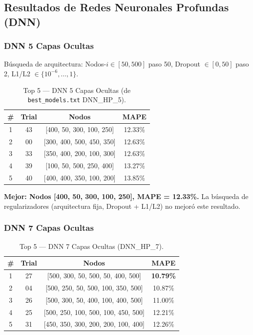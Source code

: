 \documentclass{article}
\begin{document}
\subsection{Resultados de Redes Neuronales Profundas (DNN)}

\subsubsection{DNN 5 Capas Ocultas}
Búsqueda de arquitectura: Nodos-$i \in [50, 500]$ paso 50, Dropout $\in [0, 50]$ paso 2, L1/L2 $\in \{10^{-6},\dots,1\}$.

\begin{table}[htbp]
\centering
\caption{Top 5 — DNN 5 Capas Ocultas (de \texttt{best\_models.txt} DNN\_HP\_5).}
\label{tab:dnn5}
\begin{tabular}{cccc}
\hline
\# & Trial & Nodos & MAPE \\
\hline
1 & 43 & [400, 50, 300, 100, 250] & 12.33\% \\
2 & 00 & [300, 400, 500, 450, 350] & 12.63\% \\
3 & 33 & [350, 400, 200, 100, 300] & 12.63\% \\
4 & 39 & [100, 50, 500, 250, 400] & 13.27\% \\
5 & 40 & [400, 400, 350, 100, 200] & 13.85\% \\
\hline
\end{tabular}
\end{table}

\textbf{Mejor: Nodos [400, 50, 300, 100, 250], MAPE = 12.33\%.} La búsqueda de regularizadores (arquitectura fija, Dropout + L1/L2) no mejoró este resultado.

\subsubsection{DNN 7 Capas Ocultas}

\begin{table}[htbp]
\centering
\caption{Top 5 — DNN 7 Capas Ocultas (DNN\_HP\_7).}
\label{tab:dnn7}
\begin{tabular}{cccc}
\hline
\# & Trial & Nodos & MAPE \\
\hline
1 & 27 & [500, 300, 50, 500, 50, 400, 500] & \textbf{10.79\%} \\
2 & 04 & [500, 250, 50, 500, 100, 350, 500] & 10.87\% \\
3 & 26 & [500, 300, 50, 400, 100, 400, 500] & 11.00\% \\
4 & 25 & [500, 250, 100, 500, 100, 450, 500] & 12.21\% \\
5 & 31 & [450, 350, 300, 200, 200, 100, 400] & 12.26\% \\
\hline
\end{tabular}
\end{table}
\end{document}

